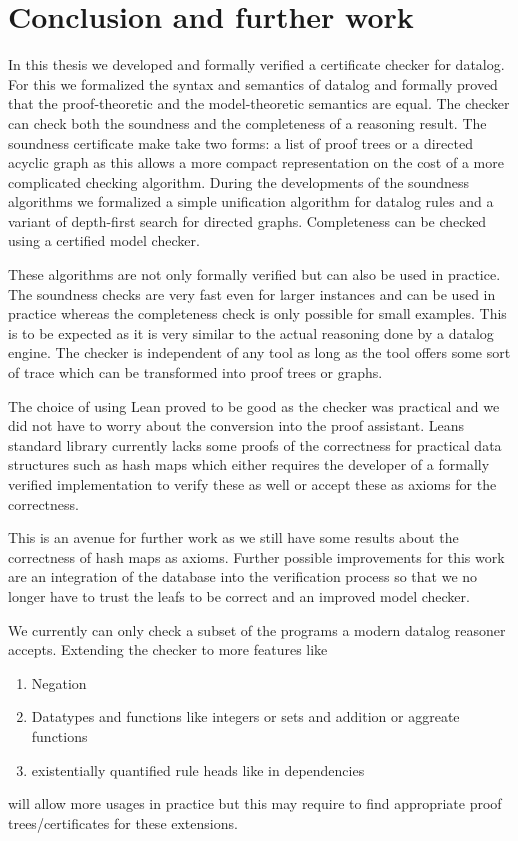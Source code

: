 \section{Conclusion and further work}

In this thesis we developed and formally verified a certificate checker for datalog. For this we formalized the syntax and semantics of datalog and formally proved that the proof-theoretic and the model-theoretic semantics are equal. The checker can check both the soundness and the completeness of a reasoning result. The soundness certificate make take two forms: a list of proof trees or a directed acyclic graph as this allows a more compact representation on the cost of a more complicated checking algorithm. During the developments of the soundness algorithms we formalized a simple unification algorithm for datalog rules and a variant of depth-first search for directed graphs. Completeness can be checked using a certified model checker. 

These algorithms are not only formally verified but can also be used in practice. The soundness checks are very fast even for larger instances and can be used in practice whereas the completeness check is only possible for small examples. This is to be expected as it is very similar to the actual reasoning done by a datalog engine. The checker is independent of any tool as long as the tool offers some sort of trace which can be transformed into proof trees or graphs.

The choice of using Lean proved to be good as the checker was practical and we did not have to worry about the conversion into the proof assistant. Leans standard library currently lacks some proofs of the correctness for practical data structures such as hash maps which either requires the developer of a formally verified implementation to verify these as well or accept these as axioms for the correctness.

This is an avenue for further work as we still have some results about the correctness of hash maps as axioms. Further possible improvements for this work are an integration of the database into the verification process so that we no longer have to trust the leafs to be correct and an improved model checker.

We currently can only check a subset of the programs a modern datalog reasoner accepts. Extending the checker to more features like
\begin{enumerate}
    \item Negation
    \item Datatypes and functions like integers or sets and addition or aggreate functions
    \item existentially quantified rule heads like in dependencies
\end{enumerate}

will allow more usages in practice but this may require to find appropriate proof trees/certificates for these extensions.